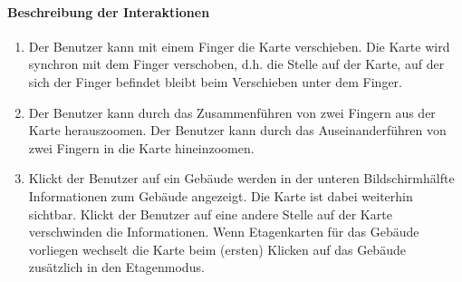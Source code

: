 \paragraph{Beschreibung der Interaktionen}
\begin{enumerate}
    \item Der Benutzer kann mit einem Finger die Karte verschieben. Die Karte wird synchron mit dem Finger verschoben, d.h. die Stelle auf der Karte, auf der sich der Finger befindet bleibt beim Verschieben unter dem Finger.
    \item Der Benutzer kann durch das Zusammenführen von zwei Fingern aus der Karte herauszoomen. Der Benutzer kann durch das Auseinanderführen von zwei Fingern in die Karte hineinzoomen.
    \item Klickt der Benutzer auf ein Gebäude werden in der unteren Bildschirmhälfte Informationen zum Gebäude angezeigt. Die Karte ist dabei weiterhin sichtbar. Klickt der Benutzer auf eine andere Stelle auf der Karte verschwinden die Informationen. Wenn Etagenkarten für das Gebäude vorliegen wechselt die Karte beim (ersten) Klicken auf das Gebäude zusätzlich in den Etagenmodus.
\end{enumerate}